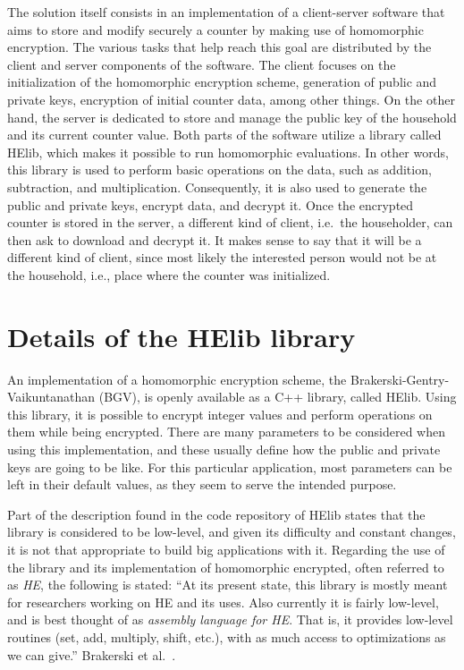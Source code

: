 The solution itself consists in an implementation of a client-server software that aims to store and modify securely a counter by making use of homomorphic encryption. The various tasks that help reach this goal are distributed by the client and server components of the software. The client focuses on the initialization of the homomorphic encryption scheme, generation of public and private keys, encryption of initial counter data, among other things. On the other hand, the server is dedicated to store and manage the public key of the household and its current counter value. Both parts of the software utilize a library called HElib, which makes it possible to run homomorphic evaluations. In other words, this library is used to perform basic operations on the data, such as addition, subtraction, and multiplication. Consequently, it is also used to generate the public and private keys, encrypt data, and decrypt it. Once the encrypted counter is stored in the server, a different kind of client, i.e.\ the householder, can then ask to download and decrypt it. It makes sense to say that it will be a different kind of client, since most likely the interested person would not be at the household, i.e., place where the counter was initialized.

\section{{Details of the HElib library}}

An implementation of a homomorphic encryption scheme, the Brakerski-Gentry-Vaikuntanathan (BGV), is openly available as a C++ library, called HElib. Using this library, it is possible to encrypt integer values and perform operations on them while being encrypted. There are many parameters to be considered when using this implementation, and these usually define how the public and private keys are going to be like. For this particular application, most parameters can be left in their default values, as they seem to serve the intended purpose. 

Part of the description found in the code repository of HElib states that the library is considered to be low-level, and given its difficulty and constant changes, it is not that appropriate to build big applications with it. Regarding the use of the library and its implementation of homomorphic encrypted, often referred to as \emph{HE}, the following is stated: ``At its present state, this library is mostly meant for researchers working on HE and its uses. Also currently it is fairly low-level, and is best thought of as \emph{assembly language for HE}. That is, it provides low-level routines (set, add, multiply, shift, etc.), with as much access to optimizations as we can give.'' Brakerski et al.\ \cite{helib}.


